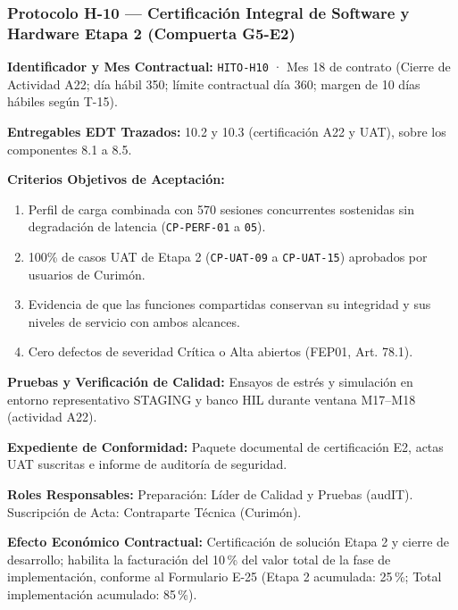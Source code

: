 \subsubsection*{Protocolo H-10 — Certificación Integral de Software y Hardware Etapa 2 (Compuerta G5-E2)}\label{sec:9-proto-h10}
\par\noindent\textbf{Identificador y Mes Contractual:} \texttt{HITO-H10} · Mes 18 de contrato (Cierre de Actividad A22; día hábil 350; límite contractual día 360; margen de 10 días hábiles según T-15).\par
\par\noindent\textbf{Entregables EDT Trazados:} 10.2 y 10.3 (certificación A22 y UAT), sobre los componentes 8.1 a 8.5.\par
\par\noindent\textbf{Criterios Objetivos de Aceptación:}
\begin{enumerate}
  \item Perfil de carga combinada con 570 sesiones concurrentes sostenidas sin degradación de latencia (\texttt{CP-PERF-01} a \texttt{05}).
  \item 100\% de casos UAT de Etapa 2 (\texttt{CP-UAT-09} a \texttt{CP-UAT-15}) aprobados por usuarios de Curimón.
  \item Evidencia de que las funciones compartidas conservan su integridad y sus niveles de servicio con ambos alcances.
  \item Cero defectos de severidad Crítica o Alta abiertos (FEP01, Art. 78.1).
\end{enumerate}
\par\noindent\textbf{Pruebas y Verificación de Calidad:} Ensayos de estrés y simulación en entorno representativo STAGING y banco HIL durante ventana M17--M18 (actividad A22).\par
\par\noindent\textbf{Expediente de Conformidad:} Paquete documental de certificación E2, actas UAT suscritas e informe de auditoría de seguridad.\par
\par\noindent\textbf{Roles Responsables:} Preparación: Líder de Calidad y Pruebas (audIT). Suscripción de Acta: Contraparte Técnica (Curimón).\par
\par\noindent\textbf{Efecto Económico Contractual:} Certificación de solución Etapa 2 y cierre de desarrollo; habilita la facturación del 10\,\% del valor total de la fase de implementación, conforme al Formulario E-25 (Etapa 2 acumulada: 25\,\%; Total implementación acumulado: 85\,\%).\par

